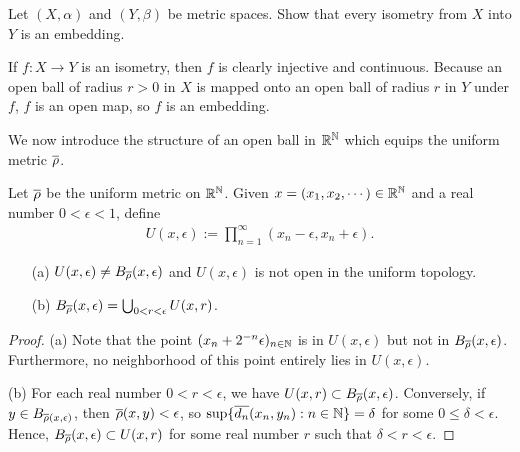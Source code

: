 \begin{prob}
    Let $(X, \alpha)$ and $(Y, \beta)$ be metric spaces.
    Show that every isometry from $X$ into $Y$ is an embedding.
\end{prob}
\begin{sol}
    If $f: X\rightarrow Y$ is an isometry, then $f$ is clearly injective and continuous.
    Because an open ball of radius $r>0$ in $X$ is mapped onto an open ball of radius $r$ in $Y$ under $f$, $f$ is an open map, so $f$ is an embedding.
\end{sol}

We now introduce the structure of an open ball in ${\mathbb{R}}^{\mathbb{N}}$ which equips the uniform metric $\overline{\rho}$.
\begin{prop}
    Let $\overline{\rho}$ be the uniform metric on ${\mathbb{R}}^{\mathbb{N}}$.
    Given $x=(x_1, x_2, \cdots)\in{\mathbb{R}}^{\mathbb{N}}$ and a real number $0<\epsilon<1$, define
    \begin{align*}
        U(x, \epsilon):=\prod_{n=1}^\infty (x_n-\epsilon, x_n+\epsilon).
    \end{align*}
    \begin{enumerate}
        \item[(a)]
        {
            $U(x, \epsilon)\neq B_{\overline{\rho}}(x, \epsilon)$ and $U(x, \epsilon)$ is not open in the uniform topology.
        }
        \item[(b)]
        {
            $B_{\overline{\rho}}(x, \epsilon)=\bigcup_{0<r<\epsilon} U(x, r)$.
        }
    \end{enumerate}
\end{prop}
\begin{proof}
    \hangindent=0.65cm
    (a)
    Note that the point $(x_n+2^{-n}\epsilon)_{n\in{\mathbb{N}}}$ is in $U(x, \epsilon)$ but not in $B_{\overline{\rho}}(x, \epsilon)$.
    Furthermore, no neighborhood of this point entirely lies in $U(x, \epsilon)$.
    
    \noindent(b)
    For each real number $0<r<\epsilon$, we have $U(x, r)\subset B_{\overline{\rho}}(x, \epsilon)$.
    Conversely, if $y\in B_{\overline{\rho}(x, \epsilon)}$, then $\overline{\rho}(x, y)<\epsilon$, so $\sup\{\overline{d_n}(x_n, y_n): n\in{\mathbb{N}}\}=\delta$ for some $0\leq\delta<\epsilon$.
    Hence, $B_{\overline{\rho}}(x, \epsilon)\subset U(x, r)$ for some real number $r$ such that $\delta<r<\epsilon$.
\end{proof}